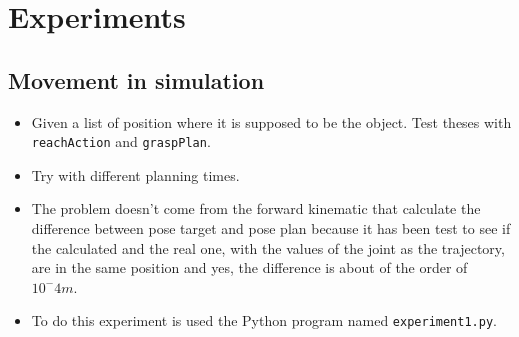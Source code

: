 \documentclass[12pt,a4paper,final,twoside,openright]{report}
\begin{document}
\chapter{Experiments}
\label{cha:experiments}

\section{Movement in simulation}
\begin{itemize}
\item Given a list of position where it is supposed to be the object. Test theses with \texttt{reachAction} and \texttt{graspPlan}.
\item Try with different planning times.
\item The problem doesn't come from the forward kinematic that calculate the difference between pose target and pose plan because it has been test to see if the calculated and the real one, with the values of the joint as the trajectory, are in the same position and yes, the difference is about of the order of $10^-4 m$.
\item To do this experiment is used the Python program named \texttt{experiment1.py}.
\end{itemize}
\end{document}
